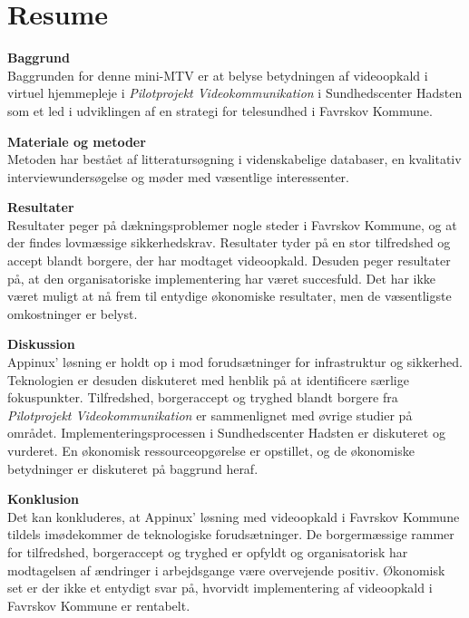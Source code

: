 \chapter{Resume}

\textbf{Baggrund}\\
Baggrunden for denne mini-MTV er at belyse betydningen af videoopkald i virtuel hjemmepleje i \textit{Pilotprojekt Videokommunikation} i Sundhedscenter Hadsten som et led i udviklingen af en strategi for telesundhed i Favrskov Kommune.

\textbf{Materiale og metoder}\\
Metoden har bestået af litteratursøgning i videnskabelige databaser, en kvalitativ interviewundersøgelse og møder med væsentlige interessenter.
 
\textbf{Resultater}\\
Resultater peger på dækningsproblemer nogle steder i Favrskov Kommune, og at der findes lovmæssige sikkerhedskrav. Resultater tyder på en stor tilfredshed og accept blandt borgere, der har modtaget videoopkald. Desuden peger resultater på, at den organisatoriske implementering har været succesfuld. Det har ikke været muligt at nå frem til entydige økonomiske resultater, men de væsentligste omkostninger er belyst. 

\textbf{Diskussion}\\
Appinux’ løsning er holdt op i mod forudsætninger for infrastruktur og sikkerhed. Teknologien er desuden diskuteret med henblik på at identificere særlige fokuspunkter. Tilfredshed, borgeraccept og tryghed blandt borgere fra \textit{Pilotprojekt Videokommunikation} er sammenlignet med øvrige studier på området. Implementeringsprocessen i Sundhedscenter Hadsten er diskuteret og vurderet. En økonomisk ressourceopgørelse er opstillet, og de økonomiske betydninger er diskuteret på baggrund heraf.

\textbf{Konklusion}\\
Det kan konkluderes, at Appinux’ løsning med videoopkald i Favrskov Kommune tildels imødekommer de teknologiske forudsætninger. De borgermæssige rammer for tilfredshed, borgeraccept og tryghed er opfyldt og organisatorisk har modtagelsen af ændringer i arbejdsgange være overvejende positiv. Økonomisk set er der ikke et entydigt svar på, hvorvidt implementering af videoopkald i Favrskov Kommune er rentabelt.